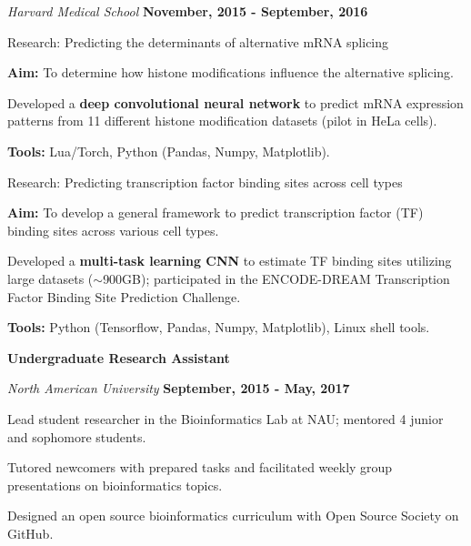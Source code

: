 \documentclass[margin,line]{res}
\begin{document}
\begin{resume}
\vspace{-.3cm}
{\em Harvard Medical School} \hfill {\bf November, 2015 - September, 2016}\\
\vspace{-.3cm}
\begin{list2}
\item Research: Predicting the determinants of alternative mRNA splicing
\begin{list2}
\item {\bf Aim:} To determine how histone modifications influence the alternative splicing.
\item Developed a {\bf deep convolutional neural network} to predict mRNA expression patterns from 11 different histone modification datasets (pilot in HeLa cells).
\item {\bf Tools:} Lua/Torch, Python (Pandas, Numpy, Matplotlib).
\end{list2}
\item Research: Predicting transcription factor binding sites across cell types
\begin{list2}
\item {\bf Aim:} To develop a general framework to predict transcription factor (TF) binding sites across various cell types.
\item Developed a {\bf multi-task learning CNN} to estimate TF binding sites utilizing large datasets ($\sim$900GB); participated in the ENCODE-DREAM Transcription Factor Binding Site Prediction Challenge.
\item {\bf Tools:} Python (Tensorflow, Pandas, Numpy, Matplotlib), Linux shell tools.
\end{list2}
\end{list2}

{\bf Undergraduate Research Assistant}

\vspace{-.3cm}
{\em North American University} \hfill {\bf September, 2015 - May, 2017}\\
\begin{list2}
\item Lead student researcher in the Bioinformatics Lab at NAU; mentored 4 junior and sophomore students.
\item Tutored newcomers with prepared tasks and facilitated weekly group presentations on bioinformatics topics.
\item Designed an open source bioinformatics curriculum with Open Source Society on GitHub.
\end{list2}


\end{resume}
\end{document}
